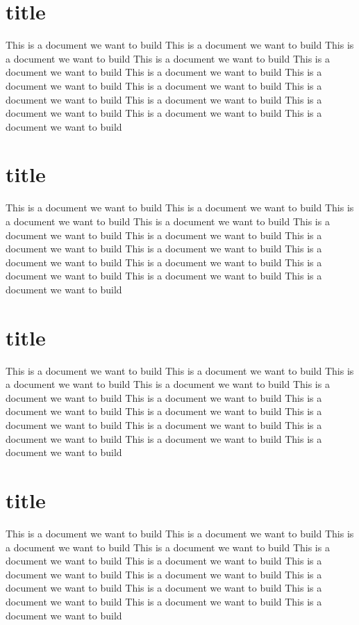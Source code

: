\documentclass{book}
\begin{document}
	\section{title}
	This is a document we want to build	This is a document we want to build	This is a document we want to build	
	This is a document we want to build	
	This is a document we want to build	This is a document we want to build	This is a document we want to build	This is a document we want to build	
	This is a document we want to build	
	This is a document we want to build	
	This is a document we want to build	
	This is a document we want to build	
	This is a document we want to build	
    \section{title}
	This is a document we want to build	This is a document we want to build	This is a document we want to build	
	This is a document we want to build	
	This is a document we want to build	This is a document we want to build	This is a document we want to build	This is a document we want to build	
	This is a document we want to build	
	This is a document we want to build	
	This is a document we want to build	
	This is a document we want to build	
	This is a document we want to build
	\section{title}
	This is a document we want to build	This is a document we want to build	This is a document we want to build	
	This is a document we want to build	
	This is a document we want to build	This is a document we want to build	This is a document we want to build	This is a document we want to build	
	This is a document we want to build	
	This is a document we want to build	
	This is a document we want to build	
	This is a document we want to build	
	This is a document we want to build
	\section{title}
	This is a document we want to build	This is a document we want to build	This is a document we want to build	
	This is a document we want to build	
	This is a document we want to build	This is a document we want to build	This is a document we want to build	This is a document we want to build	
	This is a document we want to build	
	This is a document we want to build	
	This is a document we want to build	
	This is a document we want to build	
	This is a document we want to build
\end{document}
